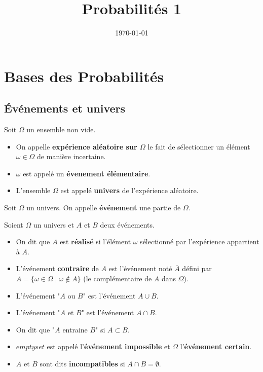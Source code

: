 \documentclass[a4paper,12pt]{article}
\title{ Probabilités 1 }
\date{\today}
\begin{document}
\maketitle
\tableofcontents
\clearpage

\section{Bases des Probabilités}

\subsection{Événements et univers}

\begin{definition}
    Soit $\Omega$ un ensemble non vide.
    \begin{itemize}[label=--]
        \item On appelle \textbf{expérience aléatoire sur $\Omega$} le fait de sélectionner un élément $\omega \in \Omega$ de manière incertaine.
        \item $\omega$ est appelé un \textbf{évenement élémentaire}.
        \item L'ensemble $\Omega$ est appelé \textbf{univers} de l'expérience aléatoire.
    \end{itemize}
\end{definition}

\begin{definition}
    Soit $\Omega$ un univers.
    On appelle \textbf{événement} une partie de $\Omega$.
\end{definition}

\begin{definition}
    Soient $\Omega$ un univers  et $A$ et $B$ deux événements.
    \begin{itemize}[label=--]
        \item On dit que $A$ est \textbf{réalisé} si l'élément $\omega$ sélectionné par l'expérience appartient à $A$.
        \item L'événement \textbf{contraire} de $A$ est l'événement noté $\overline{A}$ défini par $\overline{A} = \{\omega \in \Omega \mid \omega \notin A\}$ (le complémentaire de $A$ dans $\Omega$).
        \item L'événement "$A$ ou $B$" est l'événement $A \cup B$.
        \item L'événement "$A$ et $B$" est l'événement $A \cap B$.
        \item On dit que "$A$ entraine $B$" si $A \subset B$.
        \item $emptyset$ est appelé l'\textbf{événement impossible} et $\Omega$ l'\textbf{événement certain}.
        \item $A$ et $B$ sont dits \textbf{incompatibles} si $A \cap B = \emptyset$.
    \end{itemize}
\end{definition}
\end{document}
